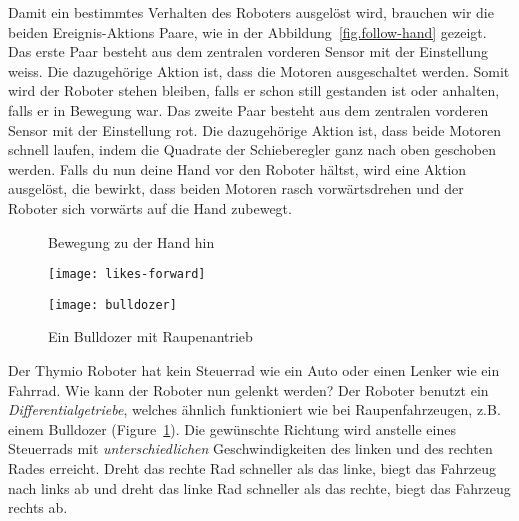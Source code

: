 
Damit  ein bestimmtes Verhalten des Roboters ausgelöst wird, 
brauchen wir die beiden Ereignis-Aktions Paare, 
wie in der Abbildung~\ref{fig.follow-hand} gezeigt. 
Das erste Paar besteht aus dem zentralen vorderen Sensor mit der Einstellung weiss. 
Die dazugehörige Aktion ist, dass die Motoren ausgeschaltet werden. 
Somit wird der Roboter stehen bleiben, falls er schon still gestanden ist oder anhalten, 
falls er in Bewegung war. 
Das zweite Paar besteht aus dem zentralen vorderen Sensor mit der Einstellung rot. 
Die dazugehörige Aktion ist, dass beide Motoren schnell laufen, indem die Quadrate der Schieberegler ganz nach oben geschoben werden. 
Falls du nun deine Hand vor den Roboter hältst, wird eine Aktion ausgelöst, die bewirkt, 
dass beiden Motoren rasch vorwärtsdrehen und  der Roboter sich vorwärts auf die Hand zubewegt.


\begin{figure}
\begin{floatrow}
	\ffigbox
	{\caption{Bewegung zu der Hand hin}\label{fig.follow-hand}}
	{\texttt{[image: likes-forward]}}
	\ffigbox
	{\caption{Ein Bulldozer mit Raupenantrieb}\label{fig.bull}}
	{\texttt{[image: bulldozer]}}
\end{floatrow}
\end{figure}


Der Thymio Roboter hat kein Steuerrad wie ein Auto oder einen Lenker wie ein Fahrrad.
Wie kann der Roboter nun gelenkt werden? Der Roboter benutzt ein \emph{Differentialgetriebe},
welches ähnlich funktioniert wie bei Raupenfahrzeugen, z.B. einem Bulldozer (Figure~\ref{fig.bull}).
Die gewünschte Richtung wird anstelle eines Steuerrads mit \emph{unterschiedlichen} Geschwindigkeiten
des linken und des rechten Rades erreicht. Dreht das rechte Rad schneller als das linke,
biegt das Fahrzeug nach links ab und dreht das linke Rad schneller als das rechte, biegt das Fahrzeug rechts ab.


